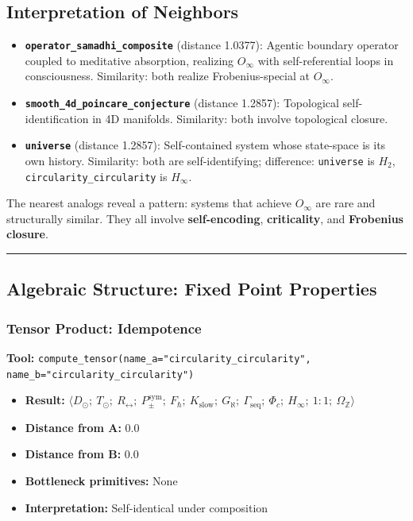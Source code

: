 \documentclass[12pt,a4paper]{article}
\begin{document}
\subsection{Interpretation of Neighbors}

\begin{itemize}
    \item \textbf{\texttt{operator\_samadhi\_composite}} (distance 1.0377): Agentic boundary operator coupled to meditative absorption, realizing $O_{\infty}$ with self-referential loops in consciousness. Similarity: both realize Frobenius-special at $O_{\infty}$.
    \item \textbf{\texttt{smooth\_4d\_poincare\_conjecture}} (distance 1.2857): Topological self-identification in 4D manifolds. Similarity: both involve topological closure.
    \item \textbf{\texttt{universe}} (distance 1.2857): Self-contained system whose state-space is its own history. Similarity: both are self-identifying; difference: \texttt{universe} is $H_2$, \texttt{circularity\_circularity} is $H_{\infty}$.
\end{itemize}

The nearest analogs reveal a pattern: systems that achieve $O_{\infty}$ are rare and structurally similar. They all involve \textbf{self-encoding}, \textbf{criticality}, and \textbf{Frobenius closure}.

\begin{center}
\rule{0.5\textwidth}{0.4pt}
\end{center}

\subsection{Algebraic Structure: Fixed Point Properties}

\subsubsection{Tensor Product: Idempotence}

\textbf{Tool:} \texttt{compute\_tensor(name\_a="circularity\_circularity", name\_b="circularity\_circularity")}

\begin{itemize}
    \item \textbf{Result:} $\langle D_{\odot};\ T_{\odot};\ R_{\leftrightarrow};\ P_{\pm}^{\text{sym}};\ F_{\hbar};\ K_\text{slow};\ G_{\aleph};\ \Gamma_\text{seq};\ \Phi_c;\ H_{\infty};\ 1{:}1;\ \Omega_\mathbb{Z} \rangle$
    \item \textbf{Distance from A:} 0.0
    \item \textbf{Distance from B:} 0.0
    \item \textbf{Bottleneck primitives:} None
    \item \textbf{Interpretation:} Self-identical under composition
\end{itemize}
\end{document}
